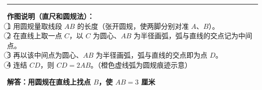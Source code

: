 \documentclass[12pt, a4paper]{ctexart}
\begin{document}
\vspace{1cm}
\hrule
\vspace{0.4cm}

{\small\color{gray}
\textbf{作图说明（直尺和圆规法）：}\\
\textcircled{1} 用圆规量取线段 $AB$ 的长度（张开圆规，使两脚分别对准 $A$、$B$）。\\
\textcircled{2} 在直线上取一点 $C$，以 $C$ 为圆心、$AB$ 为半径画弧，弧与直线的交点记为中间点。\\
\textcircled{3} 再以该中间点为圆心、$AB$ 为半径画弧，弧与直线的交点即为点 $D$。\\
\textcircled{4} 连结 $CD$，则 $CD = 2AB$。\quad（橙色虚线弧为圆规痕迹示意）
}


\newpage

\begin{center}
  {\large\bfseries 解答：用圆规在直线上找点 $B$，使 $AB = 3$ 厘米}
\end{center}

\vspace{0.8cm}
\end{document}
